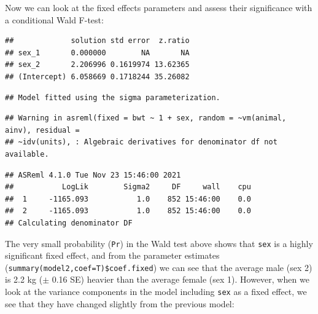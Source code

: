 \documentclass[
  12pt,
]{book}
\newenvironment{Shaded}{\begin{snugshade}}{\end{snugshade}}
\newcommand{\DataTypeTok}[1]{\textcolor[rgb]{0.13,0.29,0.53}{#1}}
\newcommand{\KeywordTok}[1]{\textcolor[rgb]{0.13,0.29,0.53}{\textbf{#1}}}
\newcommand{\NormalTok}[1]{#1}
\newcommand{\OperatorTok}[1]{\textcolor[rgb]{0.81,0.36,0.00}{\textbf{#1}}}
\newcommand{\OtherTok}[1]{\textcolor[rgb]{0.56,0.35,0.01}{#1}}
\newcommand{\StringTok}[1]{\textcolor[rgb]{0.31,0.60,0.02}{#1}}
\begin{document}
Now we can look at the fixed effects parameters and assess their significance with a conditional Wald F-test:

\begin{Shaded}
\end{Shaded}

\begin{verbatim}
##             solution std error  z.ratio
## sex_1       0.000000        NA       NA
## sex_2       2.206996 0.1619974 13.62365
## (Intercept) 6.058669 0.1718244 35.26082
\end{verbatim}

\begin{verbatim}
## Model fitted using the sigma parameterization.
\end{verbatim}

\begin{verbatim}
## Warning in asreml(fixed = bwt ~ 1 + sex, random = ~vm(animal, ainv), residual =
## ~idv(units), : Algebraic derivatives for denominator df not available.
\end{verbatim}

\begin{verbatim}
## ASReml 4.1.0 Tue Nov 23 15:46:00 2021
##           LogLik        Sigma2     DF     wall    cpu
##  1     -1165.093           1.0    852 15:46:00    0.0
##  2     -1165.093           1.0    852 15:46:00    0.0
## Calculating denominator DF
\end{verbatim}

The very small probability (\texttt{Pr}) in the Wald test above shows that \texttt{sex} is a highly significant fixed effect, and from the parameter estimates (\texttt{summary(model2,coef=T)\$coef.fixed}) we can see that the average male (sex 2) is 2.2 kg (\(\pm\) 0.16 SE) heavier than the average female (sex 1). However, when we look at the variance components in the model including \texttt{sex} as a fixed effect, we see that they have changed slightly from the previous model:

\begin{Shaded}
\end{Shaded}
\end{document}
